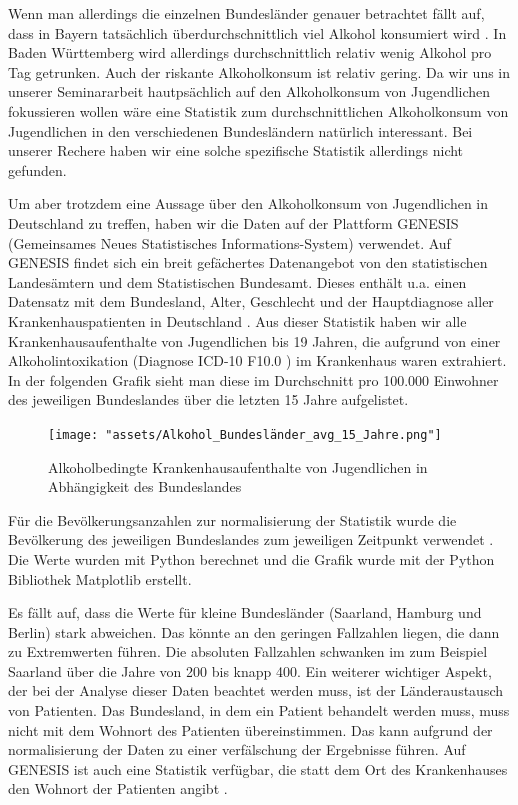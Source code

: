 \documentclass{article}
\begin{document}
Wenn man allerdings die einzelnen Bundesländer genauer betrachtet fällt auf, dass in Bayern tatsächlich überdurchschnittlich viel Alkohol konsumiert wird \autocite{kraus_einfluss_2001}. In Baden Württemberg wird allerdings durchschnittlich relativ wenig Alkohol pro Tag getrunken. Auch der riskante Alkoholkonsum ist relativ gering. Da wir uns in unserer Seminararbeit hautpsächlich auf den Alkoholkonsum von Jugendlichen fokussieren wollen wäre eine Statistik zum durchschnittlichen Alkoholkonsum von Jugendlichen in den verschiedenen Bundesländern natürlich interessant. Bei unserer Rechere haben wir eine solche spezifische Statistik allerdings nicht gefunden. 

Um aber trotzdem eine Aussage über den Alkoholkonsum von Jugendlichen in Deutschland zu treffen, haben wir die Daten auf der Plattform GENESIS (Gemeinsames Neues Statistisches Informations-System) \autocite{noauthor_statistisches_nodate} verwendet. Auf GENESIS findet sich ein breit  gefächertes Datenangebot von den statistischen Landesämtern und dem Statistischen Bundesamt. Dieses enthält u.a. einen Datensatz mit dem Bundesland, Alter, Geschlecht und der Hauptdiagnose aller Krankenhauspatienten in Deutschland \autocite{noauthor_genesis_nodate}. Aus dieser Statistik haben wir alle Krankenhausaufenthalte von Jugendlichen bis 19 Jahren, die aufgrund von einer Alkoholintoxikation (Diagnose ICD-10 F10.0 \autocite{noauthor_icd-10-code_nodate}) im Krankenhaus waren extrahiert. In der folgenden Grafik sieht man diese im Durchschnitt pro 100.000 Einwohner des jeweiligen Bundeslandes über die letzten 15 Jahre aufgelistet.

\begin{figure}[H]
    \centering
    \texttt{[image: "assets/Alkohol\_Bundesländer\_avg\_15\_Jahre.png"]}
    \caption{Alkoholbedingte Krankenhausaufenthalte von Jugendlichen in Abhängigkeit des Bundeslandes}
    \label{fig:Krankenhausaufenthalte_1}
\end{figure}

Für die Bevölkerungsanzahlen zur normalisierung der Statistik wurde die Bevölkerung des jeweiligen Bundeslandes zum jeweiligen Zeitpunkt verwendet \autocite{noauthor_statistisches_2024}. Die Werte wurden mit Python berechnet und die Grafik wurde mit der Python Bibliothek Matplotlib \autocite{noauthor_matplotlib_nodate} erstellt. 

Es fällt auf, dass die Werte für kleine Bundesländer (Saarland, Hamburg und Berlin) stark abweichen. Das könnte an den geringen Fallzahlen liegen, die dann zu Extremwerten führen. Die absoluten Fallzahlen schwanken im zum Beispiel Saarland über die Jahre von 200 bis knapp 400. Ein weiterer wichtiger Aspekt, der bei der Analyse dieser Daten beachtet werden muss, ist der Länderaustausch von Patienten. Das Bundesland, in dem ein Patient behandelt werden muss, muss nicht mit dem Wohnort des Patienten übereinstimmen. Das kann aufgrund der normalisierung der Daten zu einer verfälschung der Ergebnisse führen. Auf GENESIS ist auch eine Statistik verfügbar, die statt dem Ort des Krankenhauses den Wohnort der Patienten angibt \autocite{noauthor_genesis_nodate-1}.
\end{document}
